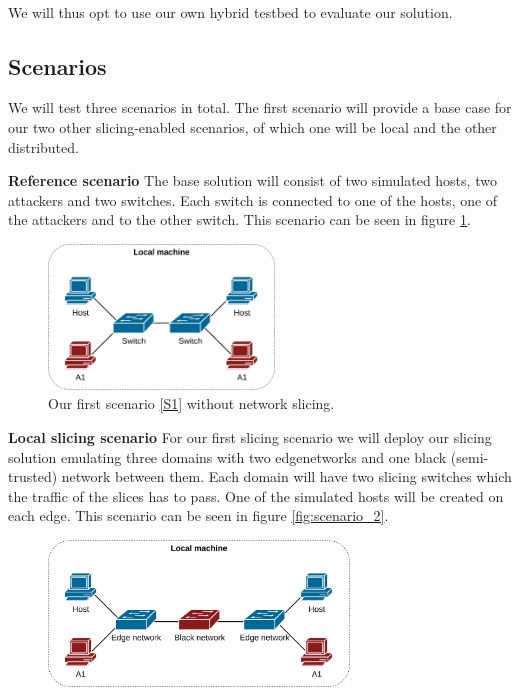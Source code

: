 \paragraph{} We will thus opt to use our own hybrid testbed to evaluate our solution.

\subsection{Scenarios}
\label{scenarios}
We will test three scenarios in total. The first scenario will provide a base case for our two other slicing-enabled scenarios, of which one will be local and the other distributed.

\begin{description}[style=multiline, labelwidth=0.7cm]
    \item[\namedlabel{S1}{S1}] \textbf{Reference scenario} The base solution will consist of two simulated hosts, two attackers and two switches. Each switch is connected to one of the hosts, one of the attackers and to the other switch. This scenario can be seen in figure \ref{fig:scenario_1}.
    \begin{figure}[ht]
        \centering
        \includegraphics[width=6cm]{images/chapter_7/scenario_1.png}
        \caption[Validation Scenario 1]{Our first scenario \ref{S1} without network slicing.}
        \label{fig:scenario_1}
    \end{figure}
    \item[\namedlabel{S2}{S2}] \textbf{Local slicing scenario} For our first slicing scenario we will deploy our slicing solution emulating three domains with two \gls{edgenetwork}s and one black (semi-trusted) network between them. Each domain will have two slicing switches which the traffic of the slices has to pass. One of the simulated hosts will be created on each edge. This scenario can be seen in figure \ref{fig:scenario_2}.
    \begin{figure}[ht]
        \centering
        \includegraphics[width=8cm]{images/chapter_7/scenario_2.png}

\end{figure}
\end{description}
